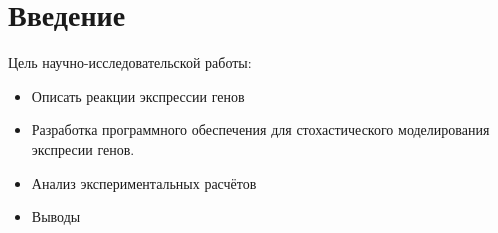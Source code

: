 \section*{Введение}
Цель научно-исследовательской работы:
\begin{itemize}
    \item Описать реакции экспрессии генов
    \item Разработка программного обеспечения для стохастического моделирования
    экспресии генов.
    \item Анализ экспериментальных расчётов
    \item Выводы
\end{itemize}
